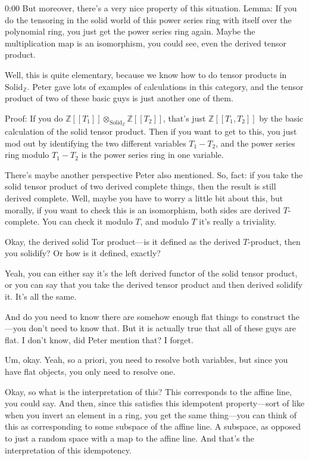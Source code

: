 \begin{unfinished}{0:00}
But moreover, there's a very nice property of this situation. Lemma: If you do the tensoring in the solid world of this power series ring with itself over the polynomial ring, you just get the power series ring again. Maybe the multiplication map is an isomorphism, you could see, even the derived tensor product.

Well, this is quite elementary, because we know how to do tensor products in $\mathrm{Solid}_\mathbb{Z}$. Peter gave lots of examples of calculations in this category, and the tensor product of two of these basic guys is just another one of them. 

Proof: If you do $\mathbb{Z}[[T_1]] \otimes_{\mathrm{Solid}_\mathbb{Z}} \mathbb{Z}[[T_2]]$, that's just $\mathbb{Z}[[T_1, T_2]]$ by the basic calculation of the solid tensor product. Then if you want to get to this, you just mod out by identifying the two different variables $T_1 - T_2$, and the power series ring modulo $T_1 - T_2$ is the power series ring in one variable.

There's maybe another perspective Peter also mentioned.
So, fact: if you take the solid tensor product of two derived complete things, then the result is still derived complete. Well, maybe you have to worry a little bit about this, but morally, if you want to check this is an isomorphism, both sides are derived $T$-complete. You can check it modulo $T$, and modulo $T$ it's really a triviality.

Okay, the derived solid Tor product---is it defined as the derived $T$-product, then you solidify? Or how is it defined, exactly?

Yeah, you can either say it's the left derived functor of the solid tensor product, or you can say that you take the derived tensor product and then derived solidify it. It's all the same.

And do you need to know there are somehow enough flat things to construct the---you don't need to know that. But it is actually true that all of these guys are flat. I don't know, did Peter mention that? I forget.

Um, okay. Yeah, so a priori, you need to resolve both variables, but since you have flat objects, you only need to resolve one.

Okay, so what is the interpretation of this? This corresponds to the affine line, you could say. And then, since this satisfies this idempotent property---sort of like when you invert an element in a ring, you get the same thing---you can think of this as corresponding to some subspace of the affine line. A subspace, as opposed to just a random space with a map to the affine line. And that's the interpretation of this idempotency.


\end{unfinished}
